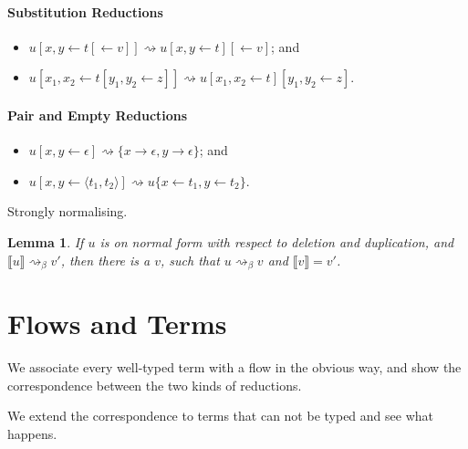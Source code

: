 \documentclass[11pt,a4paper]{article}
\theoremstyle{definition}
\theoremstyle{plain}
\newtheorem{lemma}[definition]{Lemma}
\theoremstyle{remark}
\begin{document}
\paragraph{Substitution Reductions}

\begin{itemize}
\item $u[x,y\leftarrow t[\leftarrow v]]\rightsquigarrow u[x,y\leftarrow t][\leftarrow v]$; and
\item $u[x_1,x_2\leftarrow t[y_1,y_2\leftarrow z]]\rightsquigarrow u[x_1,x_2\leftarrow t][y_1,y_2\leftarrow z]$.
\end{itemize}

\paragraph{Pair and Empty Reductions}

\begin{itemize}
\item $u[x,y\leftarrow\epsilon]\rightsquigarrow\{x\rightarrow\epsilon,y\rightarrow\epsilon\}$; and
\item $u[x,y\leftarrow\langle t_1,t_2\rangle]\rightsquigarrow u\{x\leftarrow t_1,y\leftarrow t_2\}$.
\end{itemize}

Strongly normalising.

\begin{lemma}
If $u$ is on normal form with respect to deletion and duplication, and $\llbracket u\rrbracket\rightsquigarrow_\beta v'$, then there is a $v$, such that $u\rightsquigarrow_\beta v$ and $\llbracket v\rrbracket=v'$.
\end{lemma}


\section{Flows and Terms}

We associate every well-typed term with a flow in the obvious way, and show the correspondence between the two kinds of reductions.

We extend the correspondence to terms that can not be typed and see what happens.
\end{document}
